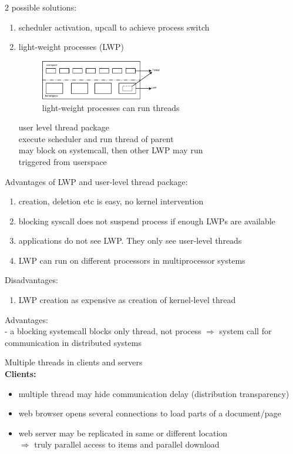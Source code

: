 \documentclass[ngerman,a4paper]{report}
\begin{document}
2 possible solutions:\\
\begin{enumerate}
\item scheduler activation, upcall to achieve process switch
\item light-weight processes (LWP)\\
\begin{figure}[h]
	\centering
	\includegraphics[width=200px]{gfx/thread_lwp.png}
	\caption{light-weight processes can run threads}
	\label{img:lwp_threads}
\end{figure}
user level thread package\\
execute scheduler and run thread of parent\\
may block on systemcall, then other LWP may run\\
triggered from userspace\\
\end{enumerate}
Advantages of LWP and user-level thread package:\\
\begin{enumerate}
\item creation, deletion etc is easy, no kernel intervention
\item blocking syscall does not suspend process if enough LWPs are available
\item applications do not see LWP. They only see user-level threads
\item LWP can run on different processors in multiprocessor systems
\end{enumerate}

Disadvantages:\\
\begin{enumerate}
\item LWP creation as expensive as creation of kernel-level thread
\end{enumerate}

Advantages:\\
- a blocking systemcall blocks only thread, not process
$\Rightarrow$ system call for communication in distributed systems

Multiple threads in clients and servers\\

\textbf{Clients:}\\
\begin{itemize}
\item multiple thread may hide communication delay (distribution transparency)
\item web browser opens several connections to load parts of a document/page
\item web server may be replicated in same or different location\\
$\Rightarrow$ truly parallel access to items and parallel download
\end{itemize}
\end{document}
